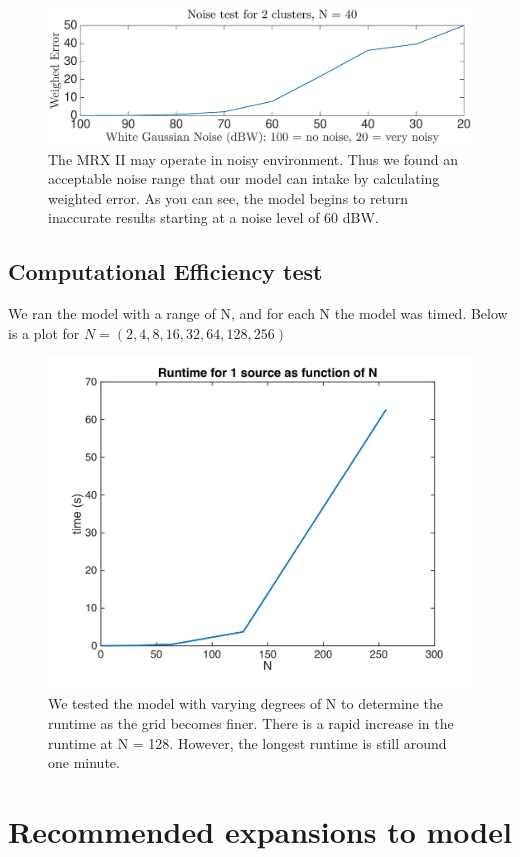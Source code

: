 \documentclass[a4paper]{article}
\begin{document}
\begin{figure}[H]
\centering
\includegraphics[width=1\textwidth]{noise_test.eps}
\caption{The MRX II may operate in noisy environment. Thus we found an acceptable noise range that our model can intake by calculating weighted error. As you can see, the model begins to return inaccurate results starting at a noise level of 60 dBW.}
\label{Figure 8}
\end{figure}

\subsection{Computational Efficiency test}

We ran the model with a range of N, and for each N the model was timed. Below is a plot for $N = (2, 4, 8, 16, 32, 64, 128, 256)$

\begin{figure}[H]
\centering
\includegraphics[width=.7\textwidth]{runtime_efficiency.png}
\caption{We tested the model with varying degrees of N to determine the runtime as the grid becomes finer. There is a rapid increase in the runtime at N = 128. However, the longest runtime is still around one minute.}
\label{Figure 9}
\end{figure} 

\section{Recommended expansions to model}
\end{document}
